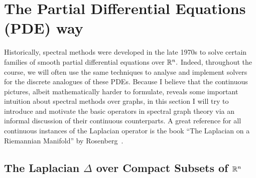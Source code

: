 \section{The Partial Differential Equations (PDE) way}

Historically, spectral methods were developed in the late 1970s to solve certain families of smooth partial differential equations over $\mathbb{R}^n.$
%
Indeed, throughout the course, we will often use the same techniques to analyse and implement solvers for the discrete analogues of these PDEs. 
%
Because I believe that the continuous pictures, albeit mathematically harder to formulate, reveals some important intuition about spectral methods over graphs, in this section I will try to introduce and motivate the basic operators in spectral graph theory via an informal discussion of their continuous counterparts. A great reference for all continuous instances of the Laplacian operator is the book ``The Laplacian on a Riemannian Manifold'' by Rosenberg~\cite{rosenbergLaplacianRiemannianManifold1997}.

\subsection{The Laplacian $\Delta$ over Compact Subsets of $\mathbb{R}^n$}



